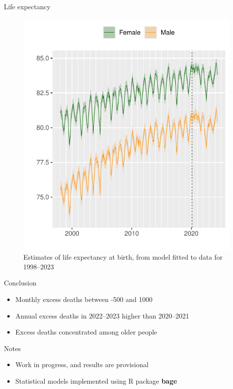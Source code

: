 \documentclass[final]{beamer}
\newlength{\onecolwid}
\begin{document}
\begin{frame}[t]
\begin{columns}[t]
\begin{column}{\onecolwid}
\begin{block}{Life expectancy}
\begin{figure}
\includegraphics[width = 0.95\linewidth]{fig_lifeexp}
\caption{Estimates of life expectancy at birth, from model fitted to data for 1998--2023}
\end{figure}
\end{block}

  
\begin{block}{Conclusion}
  \begin{itemize}
  \item Monthly excess deaths between -500 and 1000
  \item Annual excess deaths in 2022--2023 higher than 2020--2021
  \item Excess deaths concentrated among older people
  \end{itemize}
\end{block}

\begin{block}{Notes}
\begin{itemize}
\item Work in progress, and results are provisional
\item Statistical models implemented using R package \textbf{bage}
\end{itemize}
\end{block}


\end{column}
\end{columns}
\end{frame}
\end{document}
